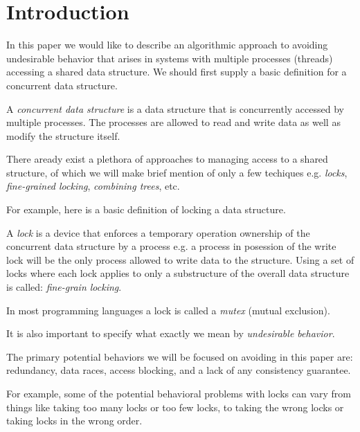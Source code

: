 \section{Introduction}

In this paper we would like to describe an algorithmic approach to avoiding undesirable behavior that arises in systems with multiple processes (threads) accessing a shared data structure. We should first supply a basic definition for a concurrent data structure.

\begin{con-def}
	\label{cds}
	A \textit{concurrent data structure} is a data structure that is concurrently accessed by multiple processes. The processes are allowed to read and write data as well as modify the structure itself.
\end{con-def}

There aready exist a plethora of approaches to managing access to a shared structure, of which we will make brief mention of only a few techiques e.g. \textit{locks}, \textit{fine-grained locking}, \textit{combining trees}, etc.

For example, here is a basic definition of locking a data structure.

\begin{con-def}[Locking]
	\label{locks}
	A \textit{lock} is a device that enforces a temporary operation ownership of the concurrent data structure by a process e.g. a process in posession of the write lock will be the only process allowed to write data to the structure. Using a set of locks where each lock applies to only a substructure of the overall data structure is called: \textit{fine-grain locking}.
\end{con-def}

In most programming languages a lock is called a \textit{mutex} (mutual exclusion).

It is also important to specify what exactly we mean by \textit{undesirable behavior}.

\begin{con-def}
	\label{ub}
	The primary potential behaviors we will be focused on avoiding in this paper are: redundancy, data races, access blocking, and a lack of any consistency guarantee.
\end{con-def}

For example, some of the potential behavioral problems with locks can vary from things like taking too many locks or too few locks, to taking the wrong locks or taking locks in the wrong order.


